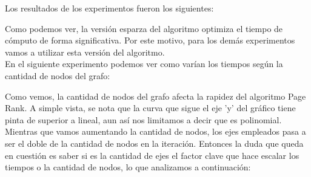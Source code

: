 Los resultados de los experimentos fueron los siguientes:

\begin{center}
\end{center}

Como podemos ver, la versión esparza del algoritmo optimiza el tiempo de cómputo de forma significativa. Por este motivo, para los demás experimentos vamos a utilizar esta versión del algoritmo.\\

En el siguiente experimento podemos ver como varían los tiempos según la cantidad de nodos del grafo:

\begin{center}
\end{center}

Como vemos, la cantidad de nodos del grafo afecta la rapidez del algoritmo Page Rank. A simple vista, se nota que la curva que sigue el eje 'y' del gráfico tiene pinta de superior a lineal, aun así nos limitamos a decir que es polinomial. Mientras que vamos aumentando la cantidad de nodos, los ejes empleados pasa a ser el doble de la cantidad de nodos en la iteración. Entonces la duda que queda en cuestión es saber si es la cantidad de ejes el factor clave que hace escalar los tiempos o la cantidad de nodos, lo que analizamos a continuación:

